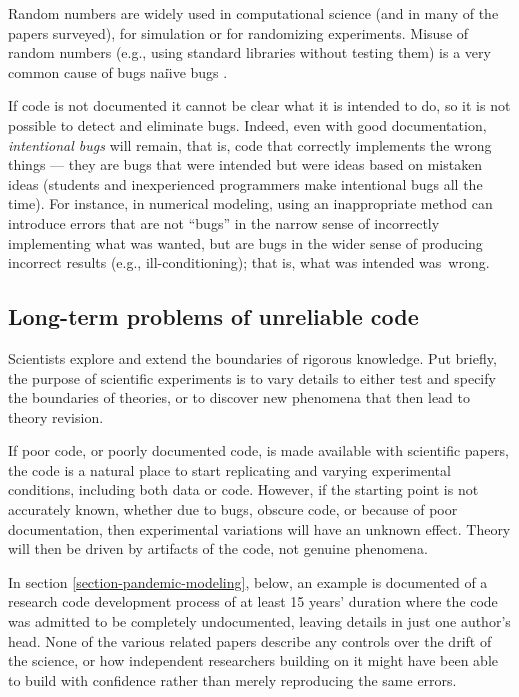 \documentclass{comjnl}
\begin{document}
Random numbers are widely used in computational science (and in many of the papers surveyed), for simulation or for randomizing experiments. Misuse of random numbers (e.g., using standard libraries without testing them) is a very common cause of bugs nai\"\i ve bugs \cite{knuth}.

If code is not documented it cannot be clear what it is intended to do, so it is not possible to detect and eliminate bugs. Indeed, even with good documentation, \emph{intentional bugs\/} will remain, that is, code that correctly implements the wrong things \cite{essence-of-software,fixit} --- they are bugs that were intended but were ideas based on mistaken ideas (students and inexperienced programmers make intentional bugs all the time). For instance, in numerical modeling, using an inappropriate method can introduce errors that are not ``bugs'' in the narrow sense of incorrectly implementing what was wanted, but are bugs in the wider sense of producing incorrect results (e.g., ill-conditioning); that is, what was intended was~wrong. 

\subsection{Long-term problems of unreliable code}
Scientists explore and extend the boundaries of rigorous knowledge. Put briefly, the purpose of scientific experiments is to vary details to either test and specify the boundaries of theories, or to discover new phenomena that then lead to theory revision. 

If poor code, or poorly documented code, is made available with scientific papers, the code is a natural place to start replicating and varying experimental conditions,  including both data or code. However, if the starting point is not accurately known, whether due to bugs, obscure code, or because of poor documentation, then experimental variations will have an unknown effect. Theory will then be driven by artifacts of the code, not genuine phenomena. 

In section \ref{section-pandemic-modeling}, below, an example is documented of a research code development process of at least 15 years' duration where the code was admitted to be completely undocumented, leaving details in just one author's head. None of the various related papers describe any controls over the drift of the science, or how independent researchers building on it might have been able to build with confidence rather than merely reproducing the same errors. 
\end{document}
